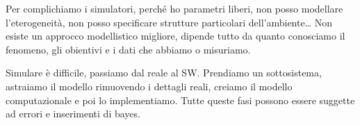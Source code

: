 Per complichiamo i simulatori, perché ho parametri liberi, non posso modellare 
l'eterogeneità, non posso specificare strutture particolari dell'ambiente\dots
Non esiste un approcco modellistico migliore, dipende tutto da quanto conosciamo 
il fenomeno, gli obientivi e i dati che abbiamo o misuriamo.

Simulare è difficile, passiamo dal reale al SW. Prendiamo un sottosistema, astraiamo il
modello rimuovendo i dettagli reali, creiamo il modello computazionale e poi lo 
implementiamo. Tutte queste fasi possono essere suggette ad errori e inserimenti 
di bayes.